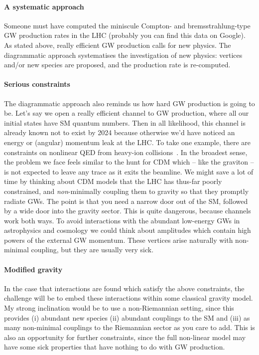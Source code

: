 \documentclass[aps,prd,reprint,preprintnumbers,showpacs,floatfix,nofootinbib,superscript address,longbibliography]{revtex4-2}
\begin{document}
\paragraph*{A systematic approach} Someone must have computed the miniscule Compton- and bremsstrahlung-type GW production rates in the LHC (probably you can find this data on Google). As stated above, really efficient GW production calls for new physics. The diagrammatic approach systematises the investigation of new physics: vertices and/or new species are proposed, and the production rate is re-computed.
\paragraph*{Serious constraints} The diagrammatic approach also reminds us how hard GW production is going to be. Let's say we open a really efficient channel to GW production, where all our initial states have SM quantum numbers. Then in all likelihood, this channel is already known not to exist by 2024 because otherwise we'd have noticed an energy or (angular) momentum leak at the LHC. To take one example, there are constraints on nonlinear QED from heavy-ion collisions~\cite{NiauAkmansoy:2018ilv}. In the broadest sense, the problem we face feels similar to the hunt for CDM which -- like the graviton -- is not expected to leave any trace as it exits the beamline. We might save a lot of time by thinking about CDM models that the LHC has thus-far poorly constrained, and \textit{non}-minimally coupling them to gravity so that they promptly radiate GWs. The point is that you need a narrow door out of the SM, followed by a wide door into the gravity sector. This is quite dangerous, because channels work both ways. To avoid interactions with the abundant low-energy GWs in astrophysics and cosmology we could think about amplitudes which contain high powers of the external GW momentum. These vertices arise naturally with non-minimal coupling, but they are usually very sick.
\paragraph*{Modified gravity} In the case that interactions are found which satisfy the above constraints, the challenge will be to embed these interactions within some classical gravity model. My strong inclination would be to use a non-Riemannian setting, since this provides (i) abundant new species (ii) abundant couplings to the SM and (iii) as many non-minimal couplings to the Riemannian sector as you care to add. This is also an opportunity for further constraints, since the full non-linear model may have some sick properties that have nothing to do with GW production.
	
%

\end{document}
